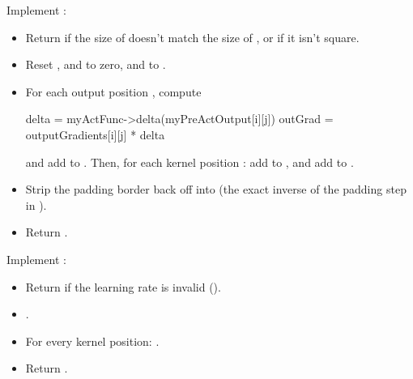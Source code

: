 \label{c8:ex:6}
Implement :
\begin{itemize}
  \item Return  if the size of  doesn't match the size of
    , or if it isn't square.
  \item Reset ,  and 
    to zero, and  to .
  \item For each output position , compute
\begin{cppcode}
delta   = myActFunc->delta(myPreActOutput[i][j])
outGrad = outputGradients[i][j] * delta
\end{cppcode}
    and add  to . Then, for each kernel position
    : add  to
    , and add  to
    .
  \item Strip the padding border back off  into
     (the exact inverse of the padding step in ).
  \item Return .
\end{itemize}

\label{c8:ex:7}
Implement :
\begin{itemize}
  \item Return  if the learning rate is invalid ().
  \item {}.
  \item For every kernel position: .
  \item Return .
\end{itemize}

